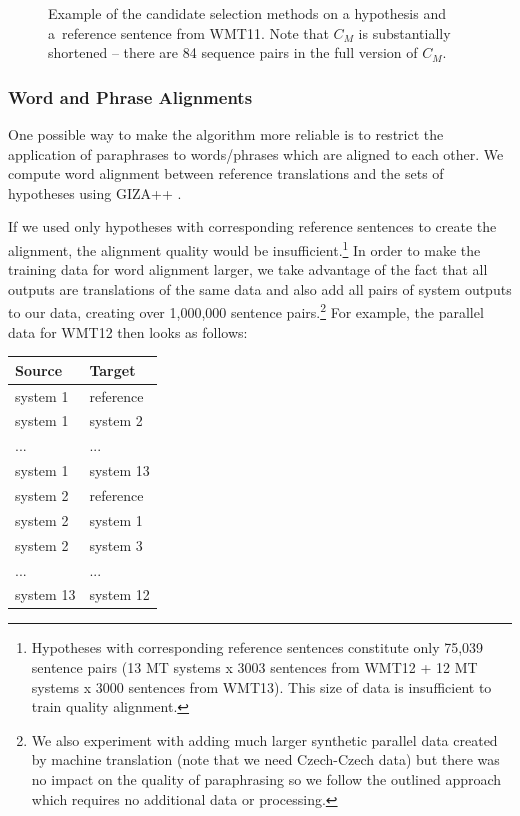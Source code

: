 \begin{figure}[t]
\begin{center}
\begin{tabular}{r|l}
\end{tabular}
\caption{Example of the candidate selection methods on a hypothesis and 
a~reference sentence from WMT11. Note that $C_{M}$ is substantially shortened
-- there are 84 sequence pairs in the full version of $C_{M}$.   }
\label{candidates_example}
\end{center}
\end{figure}



\subsubsection{Word and Phrase Alignments}
\label{alignments}
One possible way to make the algorithm more reliable is to restrict the application of paraphrases to words/phrases which are aligned to each other. 
We compute word alignment between reference translations and the sets of hypotheses using GIZA++ \citep{gizapp}.

If we used only hypotheses with corresponding reference sentences to create the alignment, 
the alignment quality would be insufficient.\footnote{Hypotheses with corresponding reference 
sentences constitute only 75,039 sentence pairs (13 MT systems x 3003 sentences from WMT12 + 
12 MT systems x 3000 sentences from WMT13). This size of data is insufficient to train quality alignment.}
In order to make the training data for word alignment larger, 
we take advantage of the fact that all outputs are translations of the same data and also add all pairs of system outputs to our data, creating over 1,000,000  sentence pairs.\footnote{We also experiment with adding much larger synthetic parallel data created by 
machine translation %
 (note that we need Czech-Czech data) but there was no 
impact on the quality of paraphrasing so we follow the outlined approach which 
requires no additional data or processing.} For example, the parallel data for 
WMT12 then looks as follows:

\begin{center}
\begin{tabular}{ll}
Source & Target \\
\hline
system 1 & reference \\
system 1 & system 2 \\
... & ...\\
system 1 & system 13 \\
system 2 & reference \\
system 2 & system 1 \\
system 2 & system 3 \\
... & ... \\
system 13 & system 12 \\
\end{tabular}
\end{center}

